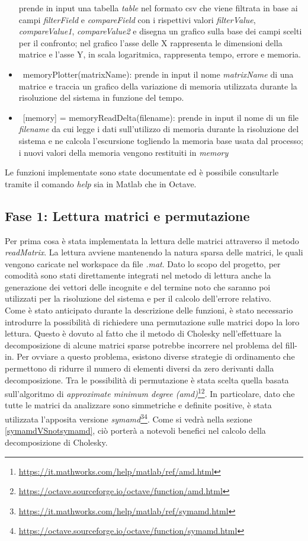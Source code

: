 \begin{itemize}
    prende in input una tabella \emph{table} nel formato csv che viene filtrata in base ai campi \emph{filterField} e \emph{compareField} con i rispettivi valori \emph{filterValue}, \emph{compareValue1}, 
    \emph{compareValue2} e disegna un grafico sulla base dei campi scelti per il confronto; 
    nel grafico l'asse delle X rappresenta le dimensioni della matrice e l'asse Y, in scala logaritmica, rappresenta tempo, errore e memoria.
    \item~memoryPlotter(matrixName): prende in input il nome \emph{matrixName} di una matrice e traccia un grafico della variazione di 
    memoria utilizzata durante la risoluzione del sistema in funzione del tempo.
    \item~[memory] = memoryReadDelta(filename): prende in input il nome di un file \emph{filename} da cui legge i dati sull'utilizzo di memoria 
    durante la risoluzione del sistema e ne calcola l'escursione togliendo la memoria base usata dal processo; i nuovi valori della memoria vengono 
    restituiti in \emph{memory}
    
\end{itemize}

Le funzioni implementate sono state documentate ed è possibile consultarle tramite il comando \emph{help} sia in Matlab che in Octave.

\subsection{Fase 1: Lettura matrici e permutazione}\label{letturaPermutazione}
Per prima cosa è stata implementata la lettura delle matrici attraverso il metodo \emph{readMatrix}. La lettura avviene mantenendo la 
natura sparsa delle matrici, le quali vengono caricate nel workspace da file \emph{.mat}. Dato lo scopo del progetto, per comodità sono 
stati direttamente integrati nel metodo di lettura anche la generazione dei vettori delle incognite e del termine noto che saranno poi 
utilizzati per la risoluzione del sistema e per il calcolo dell'errore relativo. \\
Come è stato anticipato durante la descrizione delle funzioni, è stato necessario introdurre la possibilità di richiedere una permutazione sulle 
matrici dopo la loro lettura. Questo è dovuto al fatto che il metodo di Cholesky nell'effettuare la decomposizione di alcune matrici sparse 
potrebbe incorrere nel problema del fill-in. Per ovviare a questo problema, esistono diverse strategie di ordinamento che permettono di ridurre 
il numero di elementi diversi da zero derivanti dalla decomposizione. Tra le possibilità di permutazione è stata scelta quella basata sull'algoritmo di 
\emph{approximate minimum degree (amd)}\footnote{\url{https://it.mathworks.com/help/matlab/ref/amd.html}}\footnote{\url{https://octave.sourceforge.io/octave/function/amd.html}}. 
In particolare, dato che tutte le matrici da analizzare sono simmetriche e definite positive, è stata utilizzata l'apposita versione \emph{symamd}\footnote{\url{https://it.mathworks.com/help/matlab/ref/symamd.html}}\footnote{\url{https://octave.sourceforge.io/octave/function/symamd.html}}. 
Come si vedrà nella sezione \ref{symamdVSnotsymamd}, ciò porterà a notevoli benefici nel calcolo della decomposizione di Cholesky.

